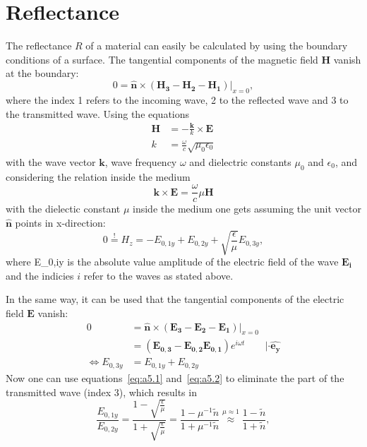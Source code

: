 \section{Reflectance}
\label{sec:Reflectance}
The reflectance $R$ of a material can easily be calculated by using the boundary conditions of a surface. The tangential components of the magnetic field $\mathbf{H}$ vanish at the boundary:
\begin{equation}
    0 = \mathbf{\hat{n}} \times (\mathbf{H_3} - \mathbf{H_2} - \mathbf{H_1})|_{x=0},
\end{equation}
where the index 1 refers to the incoming wave, 2 to the reflected wave and 3 to the transmitted wave. Using the equations
\begin{align}
    \mathbf{H} &= - \frac{\mathbf{k}}{k} \times \mathbf{E} \\
    k &= \frac{\omega}{c} \sqrt{\mu_0 \epsilon_0}
\end{align}
with the wave vector $\mathbf{k}$, wave frequency $\omega$ and dielectric constants $\mu_0$ and $\epsilon_0$, and considering the relation inside the medium
\begin{equation}
    \mathbf{k} \times \mathbf{E} = \frac{\omega}{c} \mu \mathbf{H}
\end{equation}
with the dielectic constant $\mu$ inside the medium one gets assuming the unit vector $\mathbf{\hat{n}}$ points in x-direction:
\begin{equation}
    0 \overset{!}{=} H_z = -E_{0,1y} + E_{0,2y} + \sqrt{\frac{\epsilon}{\mu}} E_{0,3y}, \label{eq:a5.1}
\end{equation}
where E_{0,iy} is the absolute value amplitude of the electric field of the wave $\mathbf{E_i}$ and the indicies $i$ refer to the waves as stated above. \par 
In the same way, it can be used that the tangential components of the electric field $\mathbf{E}$ vanish:
\begin{align}
    0 &= \mathbf{\hat{n}} \times (\mathbf{E_3} - \mathbf{E_2} - \mathbf{E_1})|_{x=0} \\
    &= (\mathbf{E_{0,3}} - \mathbf{E_{0,2}} \mathbf{E_{0,1}}) e^{i\omega t} \qquad |\cdot \mathbf{\hat{e_y}} \\
    \Leftrightarrow E_{0,3y} &= E_{0,1y} + E_{0,2y} \label{eq:a5.2}
\end{align}
Now one can use equations~\ref{eq:a5.1} and~\ref{eq:a5.2} to eliminate the part of the transmitted wave (index 3), which results in 
\begin{equation}
    \frac{E_{0,1y}}{E_{0,2y}} = \frac{1- \sqrt{\frac{\epsilon}{\mu}}}{1+ \sqrt{\frac{\epsilon}{\mu}}} = \frac{1- \mu^{-1} \tilde{n}}{1+ \mu^{-1} \tilde{n}} \overset{\mu \approx 1}{\approx} \frac{1-\tilde{n}}{1+ \tilde{n}},
\end{equation}
